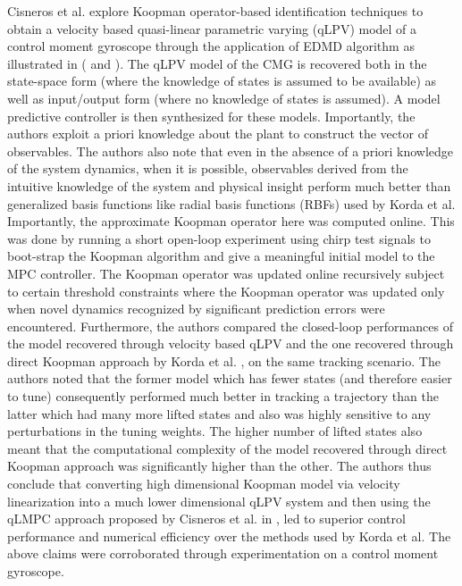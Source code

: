 Cisneros et al. \cite{Cisneros.2020} explore Koopman operator-based identification techniques to obtain a velocity based quasi-linear parametric varying (qLPV) model of a control moment gyroscope through the application of EDMD algorithm as illustrated in (\cite{Abraham} and \cite{WILLIAMS2016704}). The qLPV model of the CMG is recovered both in the state-space form (where the knowledge of states is assumed to be available) as well as input/output form (where no knowledge of states is assumed). A model predictive controller is then synthesized for these models. Importantly, the authors exploit a priori knowledge about the plant to construct the vector of observables. The authors also note that even in the absence of a priori knowledge of the system dynamics, when it is possible, observables derived from the intuitive knowledge of the system and physical insight perform much better than generalized basis functions like radial basis functions (RBFs) used by Korda et al. Importantly, the approximate Koopman operator here was computed online. This was done by running a short open-loop experiment using chirp test signals to boot-strap the Koopman algorithm and give a meaningful initial model to the MPC controller. The Koopman operator was updated online recursively subject to certain threshold constraints where the Koopman operator was updated only when novel dynamics recognized by significant prediction errors were encountered. Furthermore, the authors compared the closed-loop performances of the model recovered through velocity based qLPV and the one recovered through direct Koopman approach by Korda et al. \cite{MPC_Korda}, on the same tracking scenario. The authors noted that the former model which has fewer states (and therefore easier to tune) consequently performed much better in tracking a trajectory than the latter which had many more lifted states and also was highly sensitive to any perturbations in the tuning weights. The higher number of lifted states also meant that the computational complexity of the model recovered through direct Koopman approach was significantly higher than the other. The authors thus conclude that converting high dimensional Koopman model via velocity linearization into a much lower dimensional qLPV system and then using the qLMPC approach proposed by Cisneros et al. in \cite{Cisneros2016}, led to superior control performance and numerical efficiency over the methods used by Korda et al. The above claims were corroborated through experimentation on a control moment gyroscope.
% 
% 
% 
\par
